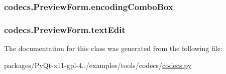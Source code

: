 \subsubsection[{encoding\+Combo\+Box}]{\setlength{\rightskip}{0pt plus 5cm}codecs.\+Preview\+Form.\+encoding\+Combo\+Box}\label{classcodecs_1_1PreviewForm_a672ca7a9c1efe89a8be114472e0a6139}
\hypertarget{classcodecs_1_1PreviewForm_ac731e5b6242e70f9f853c3611ec4c980}{}
\subsubsection[{text\+Edit}]{\setlength{\rightskip}{0pt plus 5cm}codecs.\+Preview\+Form.\+text\+Edit}\label{classcodecs_1_1PreviewForm_ac731e5b6242e70f9f853c3611ec4c980}


The documentation for this class was generated from the following file\+:\begin{DoxyCompactItemize}
\item 
packages/\+Py\+Qt-\/x11-\/gpl-\/4../examples/tools/codecs/\hyperlink{codecs_8py}{codecs.\+py}\end{DoxyCompactItemize}

